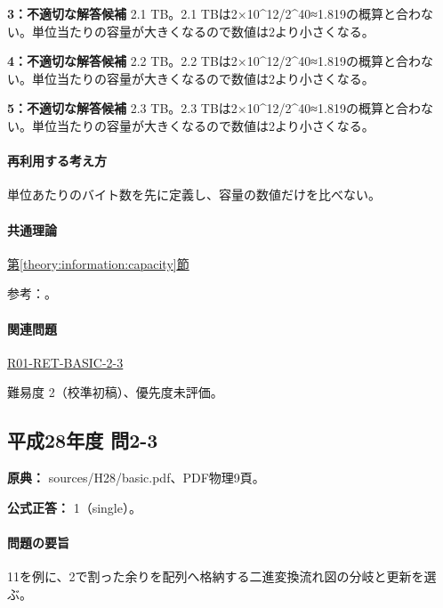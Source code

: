 \noindent\textbf{3：不適切な解答候補} 2.1 TB。2.1 TBは2×10\textasciicircum{}12/2\textasciicircum{}40≈1.819の概算と合わない。単位当たりの容量が大きくなるので数値は2より小さくなる。\par

\noindent\textbf{4：不適切な解答候補} 2.2 TB。2.2 TBは2×10\textasciicircum{}12/2\textasciicircum{}40≈1.819の概算と合わない。単位当たりの容量が大きくなるので数値は2より小さくなる。\par

\noindent\textbf{5：不適切な解答候補} 2.3 TB。2.3 TBは2×10\textasciicircum{}12/2\textasciicircum{}40≈1.819の概算と合わない。単位当たりの容量が大きくなるので数値は2より小さくなる。\par

\paragraph{再利用する考え方} 単位あたりのバイト数を先に定義し、容量の数値だけを比べない。

\paragraph{共通理論} \hyperref[theory:information:capacity]{第\ref*{theory:information:capacity}節}

\par 参考：\cite{nist_binary_prefix}。

\paragraph{関連問題} \hyperref[q:r01-ret-basic-2-3]{R01-RET-BASIC-2-3}

\par 難易度 2（校準初稿）、優先度未評価。

\subsection{平成28年度 問2-3}
\label{q:h28-reg-basic-2-3}

\noindent\textbf{原典：} sources/H28/basic.pdf、PDF物理9頁。

\textbf{公式正答：} 1（single）。

\paragraph{問題の要旨} 11を例に、2で割った余りを配列へ格納する二進変換流れ図の分岐と更新を選ぶ。

